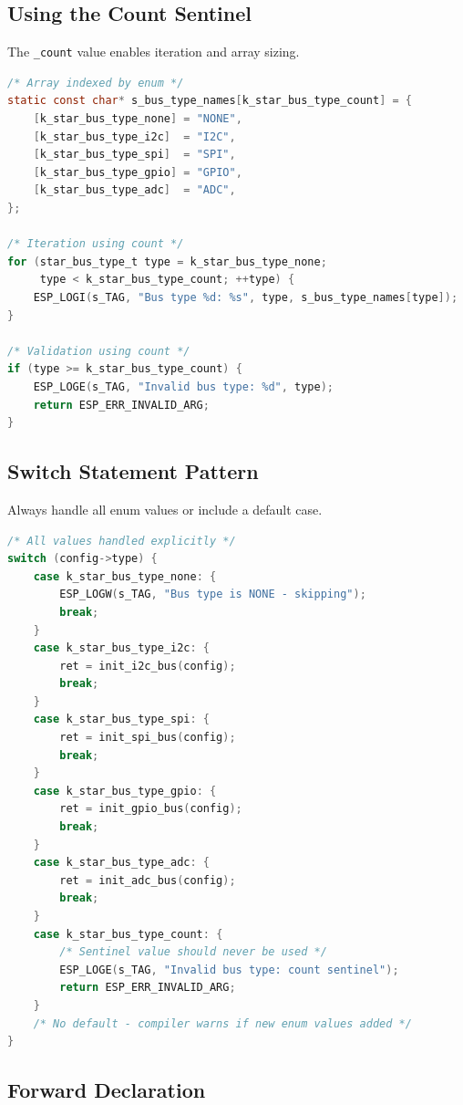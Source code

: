 \subsection{Using the Count Sentinel}

The \texttt{\_count} value enables iteration and array sizing.

\begin{lstlisting}[language=C]
/* Array indexed by enum */
static const char* s_bus_type_names[k_star_bus_type_count] = {
    [k_star_bus_type_none] = "NONE",
    [k_star_bus_type_i2c]  = "I2C",
    [k_star_bus_type_spi]  = "SPI",
    [k_star_bus_type_gpio] = "GPIO",
    [k_star_bus_type_adc]  = "ADC",
};

/* Iteration using count */
for (star_bus_type_t type = k_star_bus_type_none;
     type < k_star_bus_type_count; ++type) {
    ESP_LOGI(s_TAG, "Bus type %d: %s", type, s_bus_type_names[type]);
}

/* Validation using count */
if (type >= k_star_bus_type_count) {
    ESP_LOGE(s_TAG, "Invalid bus type: %d", type);
    return ESP_ERR_INVALID_ARG;
}
\end{lstlisting}

\subsection{Switch Statement Pattern}

Always handle all enum values or include a default case.

\begin{lstlisting}[language=C]
/* All values handled explicitly */
switch (config->type) {
    case k_star_bus_type_none: {
        ESP_LOGW(s_TAG, "Bus type is NONE - skipping");
        break;
    }
    case k_star_bus_type_i2c: {
        ret = init_i2c_bus(config);
        break;
    }
    case k_star_bus_type_spi: {
        ret = init_spi_bus(config);
        break;
    }
    case k_star_bus_type_gpio: {
        ret = init_gpio_bus(config);
        break;
    }
    case k_star_bus_type_adc: {
        ret = init_adc_bus(config);
        break;
    }
    case k_star_bus_type_count: {
        /* Sentinel value should never be used */
        ESP_LOGE(s_TAG, "Invalid bus type: count sentinel");
        return ESP_ERR_INVALID_ARG;
    }
    /* No default - compiler warns if new enum values added */
}
\end{lstlisting}

\subsection{Forward Declaration}

